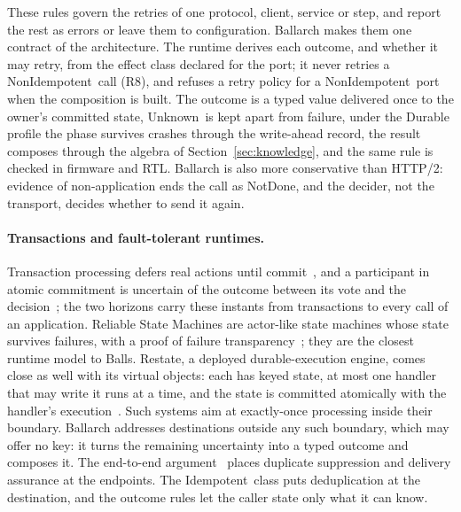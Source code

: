 \documentclass[11pt]{article}
\theoremstyle{definition}
\theoremstyle{plain}
\newcommand{\NotDone}{\textsf{NotDone}}
\newcommand{\Unknown}{\textsf{Unknown}}
\newcommand{\Idem}{\textsf{Idempotent}}
\newcommand{\NonIdem}{\textsf{NonIdempotent}}
\begin{document}
These rules govern the retries of one protocol, client, service or step, and report the rest as errors or leave them to configuration. Ballarch makes them one contract of the architecture. The runtime derives each outcome, and whether it may retry, from the effect class declared for the port; it never retries a \NonIdem\ call (R8), and refuses a retry policy for a \NonIdem\ port when the composition is built. The outcome is a typed value delivered once to the owner's committed state, \Unknown\ is kept apart from failure, under the Durable profile the phase survives crashes through the write-ahead record, the result composes through the algebra of Section~\ref{sec:knowledge}, and the same rule is checked in firmware and RTL. Ballarch is also more conservative than HTTP/2: evidence of non-application ends the call as \NotDone, and the decider, not the transport, decides whether to send it again.

\paragraph{Transactions and fault-tolerant runtimes.} Transaction processing defers real actions until commit~\citep{Gray1981}, and a participant in atomic commitment is uncertain of the outcome between its vote and the decision~\citep{BHG1987}; the two horizons carry these instants from transactions to every call of an application. Reliable State Machines are actor-like state machines whose state survives failures, with a proof of failure transparency~\citep{Mukherjee2019RSM}; they are the closest runtime model to Balls. Restate, a deployed durable-execution engine, comes close as well with its virtual objects: each has keyed state, at most one handler that may write it runs at a time, and the state is committed atomically with the handler's execution~\citep{RestateServices}. Such systems aim at exactly-once processing inside their boundary. Ballarch addresses destinations outside any such boundary, which may offer no key: it turns the remaining uncertainty into a typed outcome and composes it. The end-to-end argument~\citep{SaltzerReedClark1984} places duplicate suppression and delivery assurance at the endpoints. The \Idem\ class puts deduplication at the destination, and the outcome rules let the caller state only what it can know.
\end{document}

